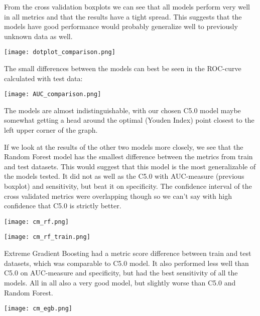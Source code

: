 \documentclass[12pt,a4paper,leqno]{report}
\theoremstyle{plain}
\theoremstyle{definition}
\theoremstyle{remark}
\begin{document}
From the cross validation boxplots we can see that all models perform very well in all metrics and that
the results have a tight spread. This suggests that the models have good performance would probably
generalize well to previously unknown data as well.

\bigskip
{
    \centering
    \texttt{[image: dotplot\_comparison.png]}
    \par
}
\bigskip

The small differences between the models can best be seen in the ROC-curve calculated with test data:

\bigskip
{
    \centering
    \texttt{[image: AUC\_comparison.png]}
    \par
}
\bigskip

The models are almost indistinguishable, with our chosen C5.0 model maybe somewhat getting a head around
the optimal (Youden Index) point closest to the left upper corner of the graph.

If we look at the results of the other two models more closely, we see that the Random Forest
model has the smallest difference between the metrics from train and test datasets. This
would suggest that this model is the most generalizable of the models tested. It did not
as well as the C5.0 with AUC-measure (previous boxplot) and sensitivity, but beat it on
specificity. The confidence interval of the cross validated metrics were overlapping though
so we can't say with high confidence that C5.0 is strictly better.

\bigskip
{
    \centering
    \texttt{[image: cm\_rf.png]}
    \par
}
\bigskip

\bigskip
{
    \centering
    \texttt{[image: cm\_rf\_train.png]}
    \par
}
\bigskip

Extreme Gradient Boosting had a metric score difference between train and test datasets, which
was comparable to C5.0 model. It also performed less well than C5.0 on AUC-measure and specificity,
but had the best sensitivity of all the models. All in all also a very good model, but slightly
worse than C5.0 and Random Forest.

\bigskip
{
    \centering
    \texttt{[image: cm\_egb.png]}
    \par
}
\bigskip
\end{document}
